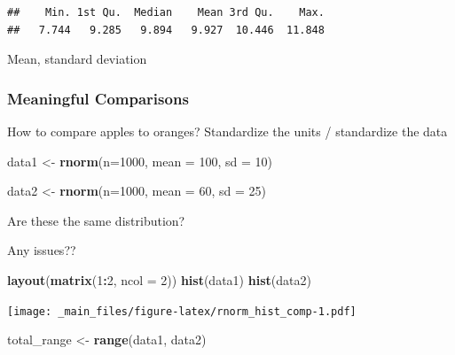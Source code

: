 \documentclass[
]{book}
\newenvironment{Shaded}{\begin{snugshade}}{\end{snugshade}}
\newcommand{\DataTypeTok}[1]{\textcolor[rgb]{0.13,0.29,0.53}{#1}}
\newcommand{\DecValTok}[1]{\textcolor[rgb]{0.00,0.00,0.81}{#1}}
\newcommand{\KeywordTok}[1]{\textcolor[rgb]{0.13,0.29,0.53}{\textbf{#1}}}
\newcommand{\NormalTok}[1]{#1}
\newcommand{\OperatorTok}[1]{\textcolor[rgb]{0.81,0.36,0.00}{\textbf{#1}}}
\newcommand{\StringTok}[1]{\textcolor[rgb]{0.31,0.60,0.02}{#1}}
\begin{document}
\begin{verbatim}
##    Min. 1st Qu.  Median    Mean 3rd Qu.    Max. 
##   7.744   9.285   9.894   9.927  10.446  11.848
\end{verbatim}

Mean, standard deviation

\hypertarget{meaningful-comparisons}{%
\subsubsection{Meaningful Comparisons}\label{meaningful-comparisons}}

How to compare apples to oranges? Standardize the units / standardize the data

\begin{Shaded}
\begin{Highlighting}[]
\NormalTok{data1 <-}\StringTok{ }\KeywordTok{rnorm}\NormalTok{(}\DataTypeTok{n=}\DecValTok{1000}\NormalTok{, }
              \DataTypeTok{mean =} \DecValTok{100}\NormalTok{,}
              \DataTypeTok{sd =} \DecValTok{10}\NormalTok{)}

\NormalTok{data2 <-}\StringTok{ }\KeywordTok{rnorm}\NormalTok{(}\DataTypeTok{n=}\DecValTok{1000}\NormalTok{,}
               \DataTypeTok{mean =} \DecValTok{60}\NormalTok{, }
               \DataTypeTok{sd =} \DecValTok{25}\NormalTok{)}
\end{Highlighting}
\end{Shaded}

Are these the same distribution?

Any issues??

\begin{Shaded}
\begin{Highlighting}[]
\KeywordTok{layout}\NormalTok{(}\KeywordTok{matrix}\NormalTok{(}\DecValTok{1}\OperatorTok{:}\DecValTok{2}\NormalTok{, }\DataTypeTok{ncol =} \DecValTok{2}\NormalTok{))}
\KeywordTok{hist}\NormalTok{(data1)}
\KeywordTok{hist}\NormalTok{(data2)}
\end{Highlighting}
\end{Shaded}

\texttt{[image: \_main\_files/figure-latex/rnorm\_hist\_comp-1.pdf]}

\begin{Shaded}
\begin{Highlighting}[]
\NormalTok{total_range <-}\StringTok{ }\KeywordTok{range}\NormalTok{(data1, data2)}
\end{Highlighting}
\end{Shaded}
\end{document}
